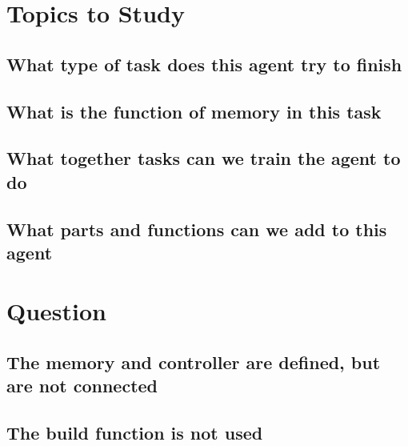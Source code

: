 \documentclass{article}
\begin{document}
\section{Topics to Study}
\subsection{What type of task does this agent try to finish}
\subsection{What is the function of memory in this task}
\subsection{What together tasks can we train the agent to do}
\subsection{What parts and functions can we add to this agent}

\section{Question}
\subsection{The memory and controller are defined, but are not connected}
\subsection{The build function is not used}
\end{document}
